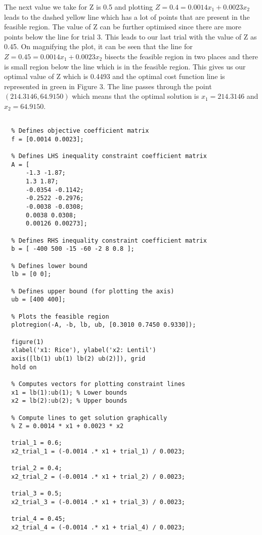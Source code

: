 \documentclass[
]{article}
\begin{document}
The next value we take for Z is 0.5 and plotting \(Z = 0.4 = 0.0014x_1 + 0.0023x_2\) leads to the dashed yellow line which has a lot of points that are present in the feasible region.
The value of Z can be further optimised since there are more points below the line for trial 3.
This leads to our last trial with the value of Z as 0.45. On magnifying the plot, it can be seen that the line for \(Z = 0.45 = 0.0014x_1 + 0.0023x_2\) bisects the feasible region in two places and there is small region
below the line which is in the feasible region. This gives us our optimal value of Z which is 0.4493 and the optimal cost function line is represented in green in Figure 3.
The line passes through the point \((214.3146, 64.9150)\) which means that the optimal solution is \(x_1 = 214.3146 \) and \(x_2 = 64.9150\).

\begin{lstlisting}[numbers=none]

  % Defines objective coefficient matrix
  f = [0.0014 0.0023];
  
  % Defines LHS inequality constraint coefficient matrix
  A = [
      -1.3 -1.87;
      1.3 1.87;
      -0.0354 -0.1142;
      -0.2522 -0.2976;
      -0.0038 -0.0308;
      0.0038 0.0308;
      0.00126 0.00273];
  
  % Defines RHS inequality constraint coefficient matrix
  b = [ -400 500 -15 -60 -2 8 0.8 ];
  
  % Defines lower bound
  lb = [0 0];
  
  % Defines upper bound (for plotting the axis)
  ub = [400 400];
  
  % Plots the feasible region
  plotregion(-A, -b, lb, ub, [0.3010 0.7450 0.9330]);
  
  figure(1)
  xlabel('x1: Rice'), ylabel('x2: Lentil')
  axis([lb(1) ub(1) lb(2) ub(2)]), grid
  hold on
  
  % Computes vectors for plotting constraint lines
  x1 = lb(1):ub(1); % Lower bounds
  x2 = lb(2):ub(2); % Upper bounds
  
  % Compute lines to get solution graphically 
  % Z = 0.0014 * x1 + 0.0023 * x2
  
  trial_1 = 0.6;
  x2_trial_1 = (-0.0014 .* x1 + trial_1) / 0.0023; 
  
  trial_2 = 0.4;
  x2_trial_2 = (-0.0014 .* x1 + trial_2) / 0.0023;
  
  trial_3 = 0.5;
  x2_trial_3 = (-0.0014 .* x1 + trial_3) / 0.0023;
  
  trial_4 = 0.45;
  x2_trial_4 = (-0.0014 .* x1 + trial_4) / 0.0023;
  

\end{lstlisting}
\end{document}
